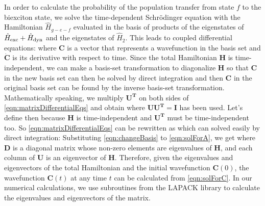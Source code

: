 In order to calculate the probability of the population transfer from state $f$ to the biexciton state, we solve the
 time-dependent Schr\"{o}dinger equation with the Hamiltonian $\hat{H}_{g-e-f}$ evaluated in the basis of products of
 the eigenstates of $\hat{H}_{\rm exc} + \hat{H}_{\rm dyn}$ and the eigenstates of $\hat{H}_2$. This leads to coupled
 differential equations:
where $\mathbf{C}$ is a vector that represents a wavefunction in the basis set and $\mathbf{\dot{C}}$ is its derivative
with respect to time. Since the total Hamiltonian $\mathbf{H}$ is time-independent, we can make a basis-set 
transformation to diagonalize $\mathbf{H}$
 so that $\mathbf{C}$ in the new basis set can then be solved by direct
 integration and then $\mathbf{C}$ in the original basis set can be found by the inverse basis-set transformation. 
Mathematically speaking, we multiply $\mathbf{U^{T}}$ on both sides of \autoref{eqn:matrixDifferentialEqs} and 
obtain
where $ \mathbf{U} \mathbf{U^{T}} = \mathbf{I}$ has been used. Let's define
then
because $\mathbf{H}$ is time-independent and $\mathbf{U^{T}}$ must be time-independent too.  
So \autoref{eqn:matrixDifferentialEqs} can be rewritten as
which can solved easily by direct integration:
Substituting \autoref{eqn:changeBasis} to \autoref{eqn:solForA}, we get
where $\mathbf{D}$ is a diagonal matrix whose non-zero elements are eigenvalues of $\mathbf{H}$, and each
column of $\mathbf{U}$ is an eigenvector of $\mathbf{H}$. Therefore, given the eigenvalues and eigenvectors of the
total Hamiltonian and the initial wavefunction $\mathbf{C}(0)$, the wavefunction $\mathbf{C}(t)$ at any time $t$ can
be calculated from \autoref{eqn:solForC}. In our numerical calculations, we use subroutines from the LAPACK library
to calculate the eigenvalues and eigenvectors of the matrix. 


